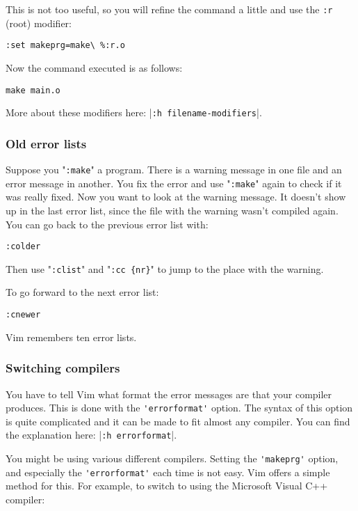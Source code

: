 This is not too useful, so you will refine the command a little and use the \verb!:r! (root) modifier:

\begin{Verbatim}[samepage=true]
 :set makeprg=make\ %:r.o
\end{Verbatim}

Now the command executed is as follows:

\begin{Verbatim}[samepage=true]
 make main.o
\end{Verbatim}

More about these modifiers here: |\verb!:h filename-modifiers!|.
\subsubsection{Old error lists}
Suppose you "\verb!:make!" a program.
There is a warning message in one file and an error message in another.
You fix the error and use "\verb!:make!" again to check if it was really fixed.
Now you want to look at the warning message.
It doesn't show up in the last error list, since the file with the warning wasn't compiled again.
You can go back to the previous error list with:

\begin{Verbatim}[samepage=true]
 :colder
\end{Verbatim}

Then use "\verb!:clist!" and "\verb!:cc {nr}!" to jump to the place with the warning.

To go forward to the next error list:

\begin{Verbatim}[samepage=true]
 :cnewer
\end{Verbatim}

Vim remembers ten error lists.
\subsubsection{Switching compilers}
You have to tell Vim what format the error messages are that your compiler produces.
This is done with the \verb!'errorformat'! option.
The syntax of this option is quite complicated and it can be made to fit almost any compiler.
You can find the explanation here: |\verb!:h errorformat!|.

You might be using various different compilers.
Setting the \verb!'makeprg'! option, and especially the \verb!'errorformat'! each time is not easy.
Vim offers a simple method for this.
For example, to switch to using the Microsoft Visual C++ compiler:

